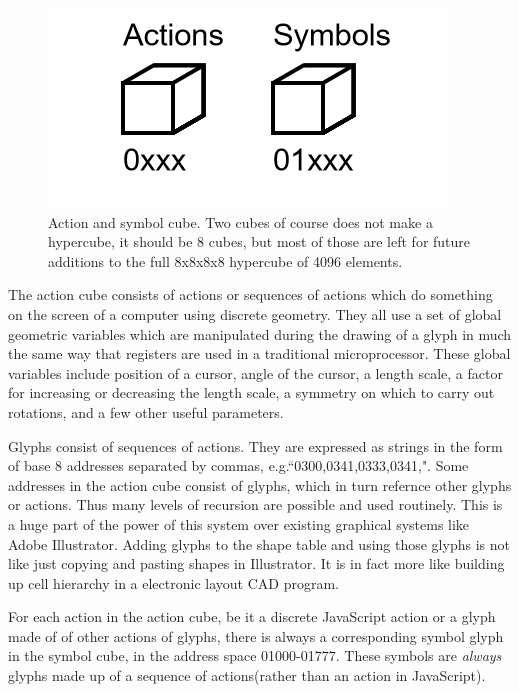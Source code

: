 \documentclass[11pt]{article}
\begin{document}
\begin{figure}

\includegraphics{figures/figure1_cubes.png}

\caption{Action and symbol cube. Two cubes of course does not make a hypercube, it should be 8 cubes, but most of those are left for future additions to the full 8x8x8x8 hypercube of 4096 elements.}
\end{figure}




    The action cube consists of actions or sequences of actions which do something on the screen of a computer using discrete geometry.  They all use a set of global geometric variables which are manipulated during the drawing of a glyph in much the same way that registers are used in a traditional microprocessor.  These global variables include position of a cursor, angle of the cursor, a length scale, a factor for increasing or decreasing the length scale, a symmetry on which to carry out rotations, and a few other useful parameters.   





    Glyphs consist of sequences of actions.  They are expressed as strings in the form of base 8 addresses separated by commas, e.g.``0300,0341,0333,0341,".  Some addresses in the action cube consist of glyphs, which in turn refernce other glyphs or actions.  Thus many levels of recursion are possible and used routinely.  This is a huge part of the power of this system over existing graphical systems like Adobe Illustrator.  Adding glyphs to the shape table and using those glyphs is not like just copying and pasting shapes in Illustrator.  It is in fact more like building up cell hierarchy in a electronic layout CAD program. 
    



    For each action in the action cube, be it a discrete JavaScript action or a glyph made of of other actions of glyphs, there is always a corresponding symbol glyph in the symbol cube, in the address space 01000-01777.  These symbols are \textit{
always} glyphs made up of a sequence of actions(rather than an action in JavaScript).  
\end{document}
